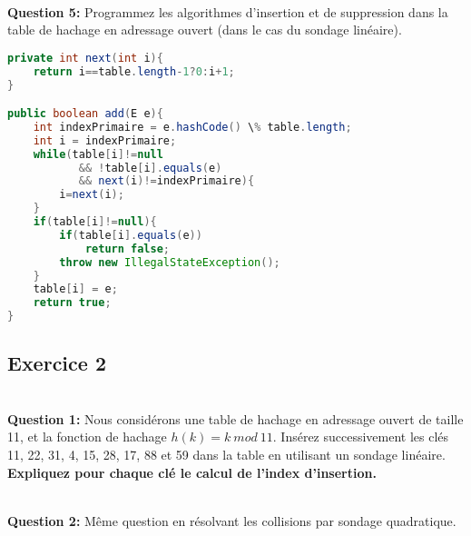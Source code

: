 \documentclass[iutinfo,a4paper,10pt]{ustl-tdtp}
\begin{document}
~\\ \textbf{Question 5:} Programmez les algorithmes d'insertion et de suppression dans la table de hachage en adressage ouvert (dans le cas du sondage linéaire).

\begin{solution}
{\color{red}
\begin{lstlisting}[language=Java]
private int next(int i){
    return i==table.length-1?0:i+1;
}

public boolean add(E e){
    int indexPrimaire = e.hashCode() \% table.length;
    int i = indexPrimaire;
    while(table[i]!=null 
           && !table[i].equals(e)
           && next(i)!=indexPrimaire){
        i=next(i);
    }
    if(table[i]!=null){
        if(table[i].equals(e))
            return false;
        throw new IllegalStateException();
    }
    table[i] = e;
    return true;
}
\end{lstlisting}
}
\end{solution}


\subsection*{Exercice 2}

~\\ \textbf{Question 1:} Nous considérons une table de hachage en adressage ouvert de taille 11, et la fonction de hachage $h(k) = k~mod~11$. Insérez successivement les clés 11, 22, 31, 4, 15, 28, 17, 88 et 59 dans la table en utilisant un sondage linéaire. \textbf{Expliquez pour chaque clé le calcul de l'index d'insertion.}


~\\ \textbf{Question 2:} Même question en résolvant les collisions par sondage quadratique.

\end{document}
